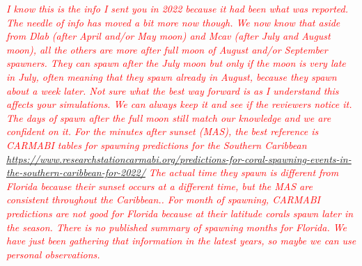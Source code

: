 \documentclass[preprint,12pt,authoryear]{elsarticle}
\newcommand{\emphc}[1]{\emph{\textcolor{red}{#1}}}
\begin{document}
\emphc{I know this is the info I sent you in 2022 because it had been what was reported. The needle of info has moved a bit more now though. We now know that aside from Dlab (after April and/or May moon) and Mcav (after July and August moon), all the others are more after full moon of August and/or September spawners. They can spawn after the July moon but only if the moon is very late in July, often meaning that they spawn already in August, because they spawn about a week later. Not sure what the best way forward is as I understand this affects your simulations. We can always keep it and see if the reviewers notice it. The days of spawn after the full moon still match our knowledge and we are confident on it. For the minutes after sunset (MAS), the best reference is CARMABI tables for spawning predictions for the Southern Caribbean \url{https://www.researchstationcarmabi.org/predictions-for-coral-spawning-events-in-the-southern-caribbean-for-2022/} The actual time they spawn is different from Florida because their sunset occurs at a different time, but the MAS are consistent throughout the Caribbean.. For month of spawning, CARMABI predictions are not good for Florida because at their latitude corals spawn later in the season. There is no published summary of spawning months for Florida. We have just been gathering that information in the latest years, so maybe we can use personal observations.}
\end{document}
